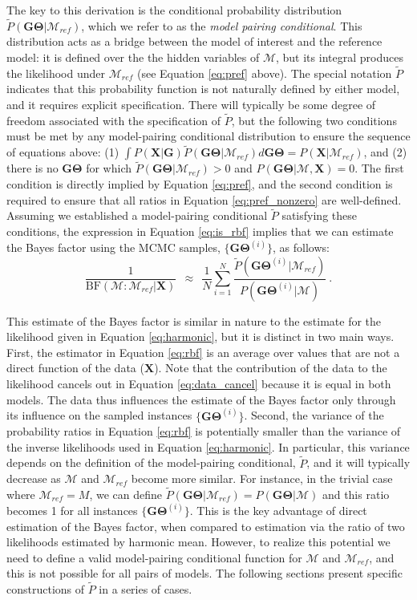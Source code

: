 \documentclass[11pt]{article}
\newcommand{\vect}[1]{\boldsymbol{\mathbf{#1}}}
\newcommand{\X}{\vect{X}}
\newcommand{\M}{\mathcal{M}}
\newcommand{\G}{\vect{G}}
\newcommand{\T}{\vect{\Theta}}
\newcommand{\GT}{\G\T}
\newcommand{\Mref}{\M_{ref}}
\newcommand{\Pref}{\widetilde{P}}
\newcommand{\rbf}{\text{BF}}
\begin{document}
The key to this derivation is the conditional probability distribution $\Pref(\GT|\Mref)$,
which we refer to as the {\em model pairing conditional}.
%
This distribution acts as a bridge between the model of interest and the reference model: it is defined over the the hidden variables of
$\M$, but its integral produces the likelihood under $\Mref$
(see Equation \ref{eq:pref} above).
%
The special notation $\Pref$ indicates that this probability function is not naturally defined by either
model, and it requires explicit specification.
%
There will typically be some degree of freedom associated with the specification of $\Pref$, but  the following two conditions must be met
by any model-pairing conditional distribution to ensure the sequence of equations above:
%
(1) $\int P(\X|\G) \Pref(\GT|\Mref)d\GT=P(\X|\Mref)$, and
(2) there is no $\GT$ for which $\Pref(\GT|\Mref)>0$ and $P(\GT|\M,\X)=0$.
%
The first condition is directly implied by Equation \ref{eq:pref}, and the second condition is required to
ensure that all ratios in Equation \ref{eq:pref_nonzero} are well-defined.
%
Assuming we established a model-pairing conditional $\Pref$ satisfying these conditions, the expression in
Equation \ref{eq:is_rbf} implies that we can estimate the Bayes factor using the MCMC samples, $\{\GT^{(i)}\}$, as follows:
%
%
\begin{equation}\label{eq:rbf}
 \frac{1}{\rbf(\M:\Mref|\X)}  ~~\approx~~ \frac{1}{N} \sum_{i=1}^{N}\frac{\Pref(\GT^{(i)}|\Mref) }{P(\GT^{(i)}|\M)} ~.
\end{equation}
%
%

This estimate of the Bayes factor is similar in nature to the estimate for the likelihood given in Equation \ref{eq:harmonic},
but it is
distinct in two main ways. First, the estimator in Equation \ref{eq:rbf} is an average over values that are
not a direct function of the data ($\X$). Note that the contribution of the data to the likelihood cancels out
in Equation \ref{eq:data_cancel} because it is equal in both models. 
The data thus influences the estimate of the Bayes factor only through its influence on the sampled instances $\{\GT^{(i)}\}$.
%
Second, the variance of the probability ratios in Equation \ref{eq:rbf} is potentially smaller than the variance of the
inverse likelihoods used in Equation \ref{eq:harmonic}.
%
In particular, this variance depends on the definition of the model-pairing conditional, $\Pref$, and it will
typically decrease as $\M$ and $\Mref$ become more similar.
For instance, in the trivial case where $\Mref=M$, we can define $\Pref(\GT|\Mref)=P(\GT|\M)$ and this ratio becomes
1 for all instances $\{\GT^{(i)}\}$.
%
This is the key advantage of direct estimation of the Bayes factor, when compared to
estimation via the ratio of two likelihoods estimated by harmonic mean.
%
However, to realize this potential we need to define a valid model-pairing conditional function for $\M$ and $\Mref$,
and this is not possible for all pairs of models. 
%
The following sections present specific constructions of $\Pref$ in a series of cases.
\end{document}

